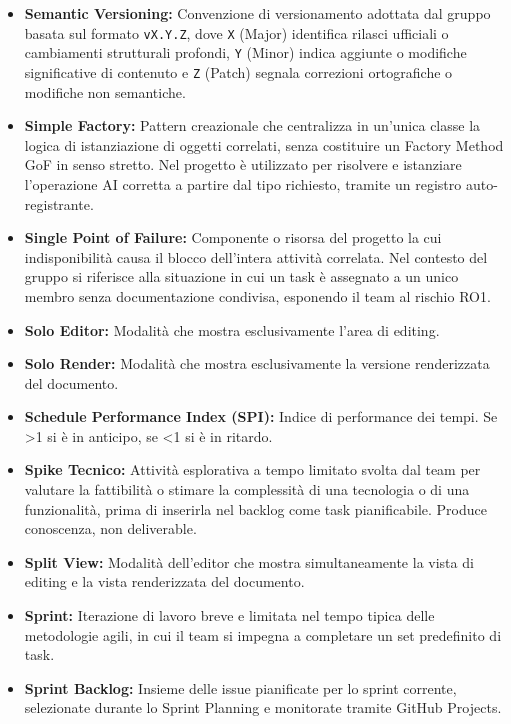 \begin{itemize}[leftmargin=*]
      \item \textbf{Semantic Versioning:} Convenzione di versionamento adottata dal
          gruppo basata sul formato \texttt{vX.Y.Z}, dove \texttt{X} (Major)
          identifica rilasci ufficiali o cambiamenti strutturali profondi,
          \texttt{Y} (Minor) indica aggiunte o modifiche significative di contenuto
          e \texttt{Z} (Patch) segnala correzioni ortografiche o modifiche non
          semantiche.
      \item \textbf{Simple Factory:} Pattern creazionale che centralizza in un'unica classe la logica di istanziazione di oggetti correlati, senza costituire un Factory Method GoF in senso stretto. Nel progetto è utilizzato per risolvere e istanziare l'operazione AI corretta a partire dal tipo richiesto, tramite un registro auto-registrante.
      \item \textbf{Single Point of Failure:} Componente o risorsa del progetto la cui
      indisponibilità causa il blocco dell'intera attività correlata. Nel contesto
      del gruppo si riferisce alla situazione in cui un task
      è assegnato a un unico membro senza documentazione condivisa, esponendo il
      team al rischio RO1.
      \item \textbf{Solo Editor:} Modalità che mostra esclusivamente l’area di editing.
      \item \textbf{Solo Render:} Modalità che mostra esclusivamente la versione renderizzata del documento.
      \item \textbf{Schedule Performance Index (SPI):} Indice di performance dei tempi.
      Se >1 si è in anticipo, se <1 si è in ritardo.
      \item \textbf{Spike Tecnico:} Attività esplorativa a tempo limitato svolta dal team
      per valutare la fattibilità o stimare la complessità di una tecnologia o di
      una funzionalità, prima di inserirla nel backlog come task
      pianificabile. Produce conoscenza, non deliverable.
      \item \textbf{Split View:} Modalità dell’editor che mostra simultaneamente la vista di editing e la vista renderizzata del documento.
      \item \textbf{Sprint:} Iterazione di lavoro breve e limitata nel tempo tipica delle metodologie agili, in cui il team si impegna a completare un set predefinito di task.
      \item \textbf{Sprint Backlog:} Insieme delle issue pianificate per lo sprint corrente, selezionate durante lo Sprint Planning e monitorate tramite GitHub Projects.

\end{itemize}
